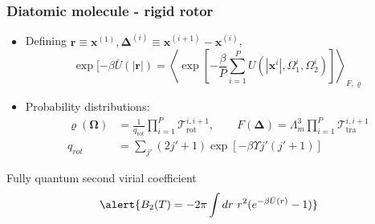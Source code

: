 \documentclass[xcolor=svgnames]{beamer}
\DeclareRobustCommand{\mc}[1]{\mathcal{#1}}
\DeclareRobustCommand{\mbf}[1]{{\boldsymbol {#1}}}
\begin{document}
        \begin{frame}
            \frametitle{Diatomic molecule - rigid rotor}
            \begin{itemize}
                \justifying
                \item Defining $\mbf{r} \equiv \mbf{x}^{(1)}, \mbf{\Delta}^{(i)} \equiv \mbf{x}^{(i+1)} - \mbf{x}^{(i)}$,
                \begin{equation*}
                    \exp [-\beta \bar{U} (|\mbf{r}|) = \left< \exp \left[ -\frac{\beta}{P} \sum_{i=1}^P U (|\mbf{x}^i|,\Omega_1^i,\Omega_2^i) \right] \right>_{F,\varrho}
                \end{equation*}
                \item Probability distributions:
                \begin{align*}
                    \varrho(\mbf{\Omega}) &= \frac{1}{q_\text{rot}} \displaystyle\prod_{i=1}^P \mc{T}_\text{rot}^{i,i+1}, \qquad F(\mbf{\Delta}) = \Lambda_m^3 \displaystyle\prod_{i=1}^P \mc{T}_\text{tra}^{i,i+1}\\
                    q_{rot} &= \displaystyle\sum_{j'} (2j' + 1) \exp \left[-\beta \Upsilon j' (j'+1) \right]
                \end{align*}
            \end{itemize}
            \begin{block}{Fully quantum second virial coefficient}
                \begin{equation*}
                    \alert{B_2 (T) = -2 \pi \displaystyle\int dr~ r^2 (e^{-\beta \bar{U} (r)} - 1)}
                \end{equation*}
            \end{block}
        \end{frame}
\end{document}

